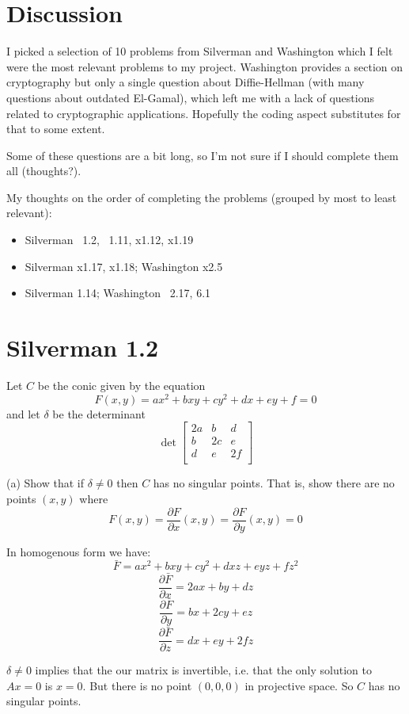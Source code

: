 \documentclass{article}
\begin{document}
\section*{Discussion}
I picked a selection of 10 problems from Silverman and Washington which I felt were the most relevant problems to my project. Washington provides a section on cryptography but only a single question about Diffie-Hellman (with many questions about outdated El-Gamal), which left me with a lack of questions related to cryptographic applications. Hopefully the coding aspect substitutes for that to some extent.

Some of these questions are a bit long, so I'm not sure if I should complete them all (thoughts?).

My thoughts on the order of completing the problems (grouped by most to least relevant):
\begin{itemize}
\item Silverman ~1.2, ~1.11, x1.12, x1.19
\item Silverman x1.17, x1.18; Washington x2.5
\item Silverman 1.14; Washington ~2.17, 6.1
\end{itemize}

\section{Silverman 1.2}
Let $C$ be the conic given by the equation
$$F(x,y) = ax^2 + bxy + cy^2 + dx + ey + f = 0$$
and let $\delta$ be the determinant
$$\det \begin{bmatrix}
2a & b & d \\
b & 2c & e \\
d & e & 2f \\
\end{bmatrix}$$

(a) Show that if $\delta \neq 0$ then $C$ has no singular points. That is, show there are no points $(x,y)$ where
$$F(x,y) = \frac{\partial F}{\partial x}(x,y) = \frac{\partial F}{\partial y}(x,y) = 0$$

In homogenous form we have:
$$\bar F = ax^2 + bxy + cy^2 + dxz + eyz + fz^2$$
$$\frac{\partial \bar F}{\partial x} = 2ax + by + dz$$
$$\frac{\partial \bar F}{\partial y} = bx + 2cy + ez$$
$$\frac{\partial \bar F}{\partial z} = dx + ey + 2fz$$

$\delta \neq 0$ implies that the our matrix is invertible, i.e. that the only solution to $Ax = 0$ is $x = 0$. But there is no point $(0,0,0)$ in projective space. So $C$ has no singular points.
\end{document}
